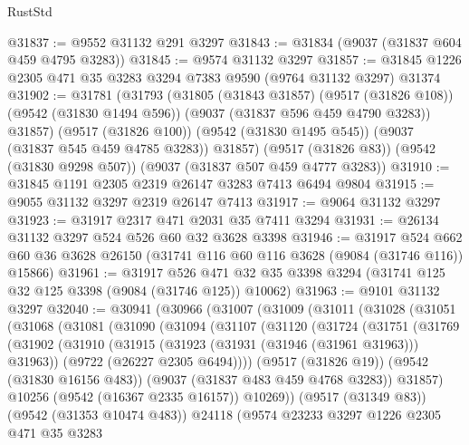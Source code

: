 \begin{lexlean}{RustStd}
\begin{coremodule}
@31837 := @9552 @31132 @291 @3297
@31843 := @31834 (@9037 (@31837 @604 @459 @4795 @3283))
@31845 := @9574 @31132 @3297
@31857 := @31845 @1226 @2305 @471 @35 @3283 @3294 @7383 @9590 (@9764 @31132 @3297) @31374
@31902 := @31781
    (@31793
      (@31805
        (@31843 @31857)
        (@9517 (@31826 @108))
        (@9542 (@31830 @1494 @596))
        (@9037 (@31837 @596 @459 @4790 @3283))
        @31857)
      (@9517 (@31826 @100))
      (@9542 (@31830 @1495 @545))
      (@9037 (@31837 @545 @459 @4785 @3283))
      @31857)
    (@9517 (@31826 @83))
    (@9542 (@31830 @9298 @507))
    (@9037 (@31837 @507 @459 @4777 @3283))
@31910 := @31845 @1191 @2305 @2319 @26147 @3283 @7413 @6494 @9804
@31915 := @9055 @31132 @3297 @2319 @26147 @7413
@31917 := @9064 @31132 @3297
@31923 := @31917 @2317 @471 @2031 @35 @7411 @3294
@31931 := @26134 @31132 @3297 @524 @526 @60 @32 @3628 @3398
@31946 := @31917
    @524
    @662
    @60
    @36
    @3628
    @26150
    (@31741 @116 @60 @116 @3628 (@9084 (@31746 @116)) @15866)
@31961 := @31917
    @526
    @471
    @32
    @35
    @3398
    @3294
    (@31741 @125 @32 @125 @3398 (@9084 (@31746 @125)) @10062)
@31963 := @9101 @31132 @3297
@32040 := @30941
    (@30966
      (@31007
        (@31009
          (@31011
            (@31028
              (@31051
                (@31068
                  (@31081
                    (@31090
                      (@31094
                        (@31107
                          (@31120
                            (@31724
                              (@31751
                                (@31769
                                  (@31902
                                    (@31910
                                      (@31915 (@31923 (@31931 (@31946 (@31961 @31963))) @31963))
                                      (@9722 (@26227 @2305 @6494))))
                                  (@9517 (@31826 @19))
                                  (@9542 (@31830 @16156 @483))
                                  (@9037 (@31837 @483 @459 @4768 @3283))
                                  @31857)
                                @10256
                                (@9542 (@16367 @2335 @16157))
                                @10269))
                            (@9517 (@31349 @83))
                            (@9542 (@31353 @10474 @483))
                            @24118
                            (@9574
                              @23233
                              @3297
                              @1226
                              @2305
                              @471
                              @35
                              @3283

\end{coremodule}
\end{lexlean}

